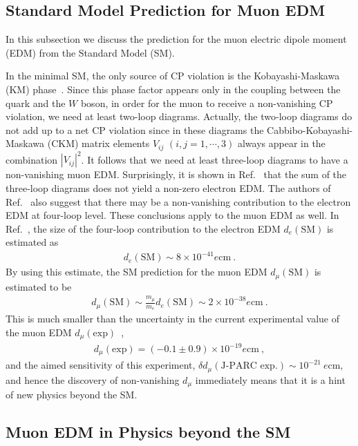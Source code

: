 \subsection{Standard Model Prediction for Muon EDM}

In this subsection we discuss the
prediction for the muon electric dipole moment (EDM)
from the Standard Model (SM).

In the minimal SM, the only source of CP violation is
the Kobayashi-Maskawa (KM) phase~\cite{Kobayashi:1973fv}.
Since this phase factor appears only in the coupling between
the quark and the $W$ boson, in order for the muon to receive a 
non-vanishing CP violation, we need at least two-loop
diagrams.  Actually, the two-loop diagrams do not add up to
a net CP violation since in these diagrams the 
Cabbibo-Kobayashi-Maskawa (CKM) matrix elements $V_{ij}$
$(i,j= 1,\cdots, 3)$ always appear in the combination $|V_{ij}|^2$.  
It follows that we need at least three-loop diagrams to
have a non-vanishing muon EDM.  
Surprisingly, it is shown in Ref.~\cite{Pospelov:1991zt} that
the sum of the three-loop diagrams does not yield a non-zero
electron EDM.  The authors of Ref.~\cite{Pospelov:1991zt}
also suggest that there may be a non-vanishing contribution
to the electron EDM at four-loop level.
These conclusions apply to the muon EDM as well.
In Ref.~\cite{Booth:1993af}, the size of the four-loop
contribution to the electron EDM $d_e(\text{SM})$ is estimated as 
%
\begin{align}
 d_e(\text{SM}) \sim 8 \times 10^{-41} e {\text{cm}}~.
\end{align}
%
By using this estimate, the SM prediction for
the muon EDM $d_\mu(\text{SM})$ is estimated to be
%
\begin{align}
 d_\mu(\text{SM}) \sim \frac{m_\mu}{m_e} d_e(\text{SM})
\sim 2 \times 10^{-38} e {\text{cm}}~.
\end{align}
%
This is much smaller than the uncertainty in the current experimental 
value of the muon EDM $d_\mu(\text{exp})$~\cite{Bennett:2008dy},
%
\begin{align}
 d_\mu(\text{exp}) = (-0.1\pm 0.9) \times 10^{-19}  e {\text{cm}}~,
\end{align}
%
and the aimed sensitivity of this experiment,
$\delta d_\mu(\text{J-PARC exp.}) \sim 10^{-21} ~ e {\text{cm}}$,
and hence the discovery of non-vanishing $d_\mu$ immediately
means that it is a hint of new physics beyond the SM.


\subsection{Muon EDM in Physics beyond the SM}

